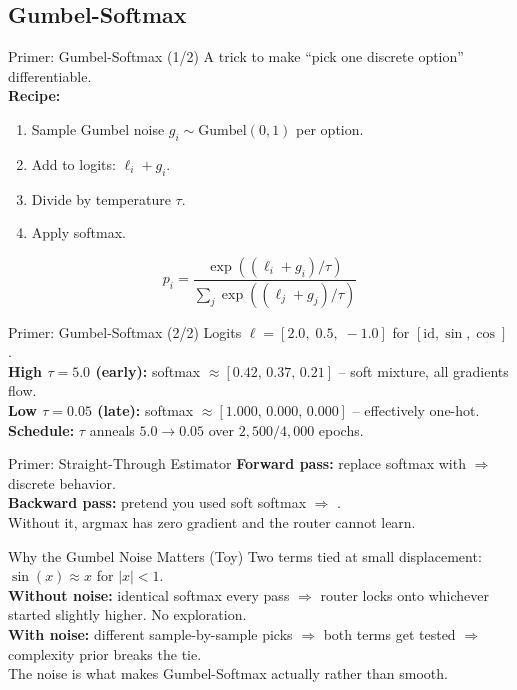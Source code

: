 \documentclass[
11pt,notheorems,hyperref={pdfauthor=Aniruddha Pandey}
]{beamer}
\begin{document}
\subsection{Gumbel-Softmax}

\begin{frame}{Primer: Gumbel-Softmax (1/2)}
A trick to make ``pick one discrete option'' differentiable.\\[0.3cm]
\textbf{Recipe:}
\begin{enumerate}
    \item Sample Gumbel noise $g_i \sim \mathrm{Gumbel}(0,1)$ per option.
    \item Add to logits: $\ell_i + g_i$.
    \item Divide by temperature $\tau$.
    \item Apply softmax.
\end{enumerate}
\begin{equation*}
    p_i = \frac{\exp((\ell_i + g_i)/\tau)}{\sum_j \exp((\ell_j + g_j)/\tau)}
\end{equation*}
\end{frame}

\begin{frame}{Primer: Gumbel-Softmax (2/2)}
Logits $\ell = [2.0,\;0.5,\;-1.0]$ for $[\mathrm{id},\sin,\cos]$.\\[0.3cm]
\textbf{High $\tau=5.0$ (early):} softmax $\approx [0.42,\,0.37,\,0.21]$ -- soft mixture, all gradients flow.\\[0.2cm]
\textbf{Low $\tau=0.05$ (late):} softmax $\approx [1.000,\,0.000,\,0.000]$ -- effectively one-hot.\\[0.3cm]
\textbf{Schedule:} $\tau$ anneals $5.0 \to 0.05$ over $2{,}500/4{,}000$ epochs.
\end{frame}

\begin{frame}{Primer: Straight-Through Estimator}
\textbf{Forward pass:} replace softmax with  $\Rightarrow$ discrete behavior.\\[0.3cm]
\textbf{Backward pass:} pretend you used soft softmax $\Rightarrow$ .\\[0.3cm]
Without it, argmax has zero gradient and the router cannot learn.
\end{frame}

\begin{frame}{Why the Gumbel Noise Matters (Toy)}
Two terms tied at small displacement: $\sin(x)\approx x$ for $|x|<1$.\\[0.3cm]
\textbf{Without noise:} identical softmax every pass $\Rightarrow$ router locks onto whichever started slightly higher. No exploration.\\[0.3cm]
\textbf{With noise:} different sample-by-sample picks $\Rightarrow$ both terms get tested $\Rightarrow$ complexity prior breaks the tie.\\[0.3cm]
The noise is what makes Gumbel-Softmax actually  rather than smooth.
\end{frame}
\end{document}
